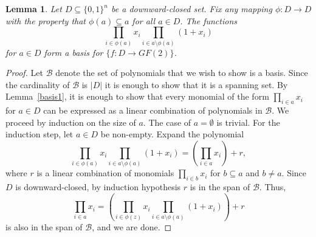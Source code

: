 \documentclass[11pt]{article}
\newtheorem{lemma}[theorem]{Lemma}
\theoremstyle{definition}
\newcommand{\1}{\mathbf{1}}
\newcommand{\R}{{\mathbb R}}
\begin{document}
 \begin{lemma}\label{basis2} Let $D \subseteq \{0,1\}^n$ be a downward-closed set.  Fix any mapping $\phi : D\to D$ with the property that $\phi(a) \subseteq a$ for all $a \in D$.   The functions \[ \prod_{i \in \phi(a)} x_i \prod_{i\in a \setminus \phi(a)}(1+x_i)\] for $a \in D$ form a basis for $\{f:D \to GF(2)\}$.
\end{lemma}
\begin{proof} 
Let $\mathcal{B}$ denote the set of polynomials that we wish to show is a basis.
Since the cardinality of $\mathcal{B}$ is $|D|$ it is enough to show that it is a spanning set.
By Lemma~\ref{basis1}, it is enough to show that every monomial of the form $\prod_{i\in a}x_i$ for $a\in D$ can be expressed as a linear combination of polynomials in $\mathcal{B}$.
We proceed by induction on the size of $a$. The case of $a=\emptyset$ is trivial.
For the induction step, let $a\in D$ be non-empty. Expand the polynomial
\[\prod_{i \in \phi(a)} x_i \prod_{i\in a\setminus\phi(a)}(1+x_i) = \left(\prod_{i \in a} x_i\right) + r,\]
where $r$ is a linear combination of monomials $\prod_{i\in b}x_i$ for $b \subseteq a$ and $b \neq a$.
Since $D$ is downward-closed, by induction hypothesis $r$ is in the span of $\mathcal{B}$. 
Thus, 
$$\prod_{i\in a}x_i = \left(\prod_{i \in \phi(z)} x_i \prod_{i\in a\setminus\phi(a)}(1+x_i)\right) + r$$
is also in the span of $\mathcal{B}$, and we are done.
 \end{proof}
\end{document}
